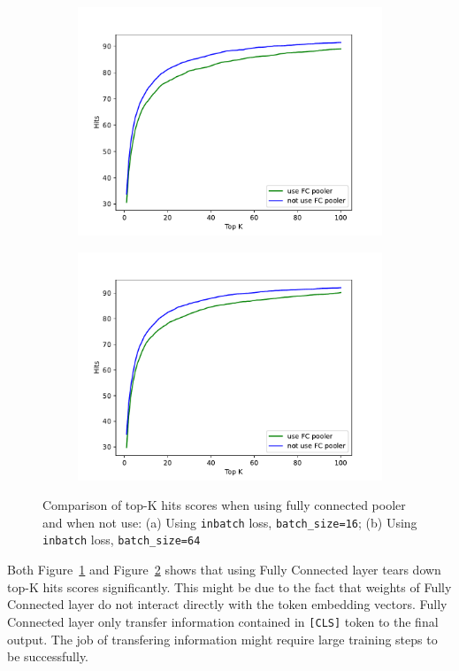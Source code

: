 \documentclass[12pt, sort&compress]{report}
\begin{document}
\begin{figure}[!htbp]
	\begin{subfigure}{.5\linewidth}
		\centering
		\includegraphics[scale=.45]{images/PDF/experiments/poolerCompare_batch16.pdf}
		\caption{}
		\label{fig:20:a}
	\end{subfigure}
	\begin{subfigure}{.5\linewidth}
		\centering
		\includegraphics[scale=.45]{images/PDF/experiments/poolerCompare_batch64.pdf}
		\caption{}
		\label{fig:20:b}
	\end{subfigure}
	\caption{Comparison of top-K hits scores when using fully connected pooler and when not use: (a) Using {\tt inbatch} loss, {\tt batch\_size=16}; (b) Using {\tt inbatch} loss, {\tt batch\_size=64}}
	\label{fig:20}
\end{figure} 
\par Both Figure~\ref{fig:20:a} and Figure~\ref{fig:20:b} shows that using Fully Connected layer tears down top-K hits scores significantly. This might be due to the fact that weights of Fully Connected layer do not interact directly with the token embedding vectors. Fully Connected layer only transfer information contained in {\tt [CLS]} token to the final output. The job of transfering information might require large training steps to be successfully.
\end{document}
